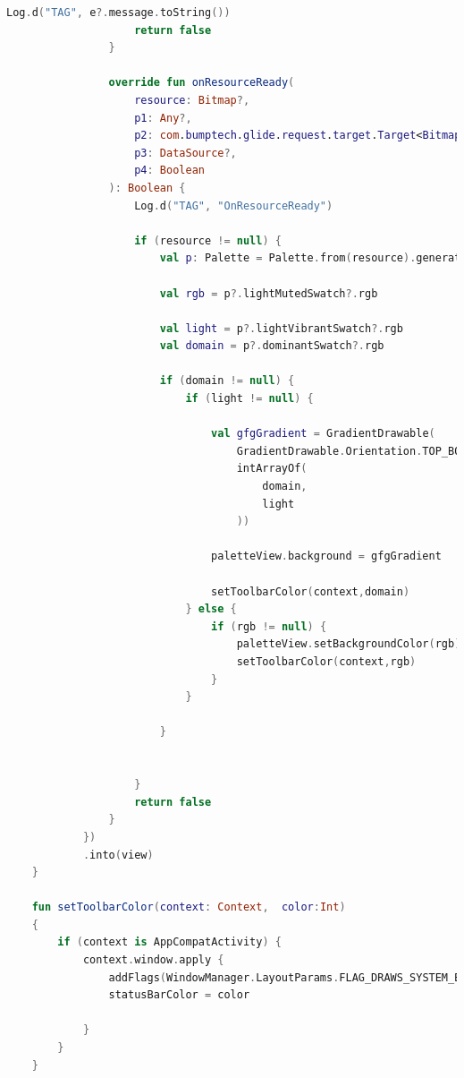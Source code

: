 \documentclass[a4paper, 12pt]{article}
\begin{document}
\begin{lstlisting}[caption={Add New View Adapters on ViewBindings.}, label={code:view_adapters}, language=Kotlin]
                    Log.d("TAG", e?.message.toString())
                    return false
                }

                override fun onResourceReady(
                    resource: Bitmap?,
                    p1: Any?,
                    p2: com.bumptech.glide.request.target.Target<Bitmap>?,
                    p3: DataSource?,
                    p4: Boolean
                ): Boolean {
                    Log.d("TAG", "OnResourceReady")

                    if (resource != null) {
                        val p: Palette = Palette.from(resource).generate()

                        val rgb = p?.lightMutedSwatch?.rgb

                        val light = p?.lightVibrantSwatch?.rgb
                        val domain = p?.dominantSwatch?.rgb

                        if (domain != null) {
                            if (light != null) {

                                val gfgGradient = GradientDrawable(
                                    GradientDrawable.Orientation.TOP_BOTTOM,
                                    intArrayOf(
                                        domain,
                                        light
                                    ))

                                paletteView.background = gfgGradient

                                setToolbarColor(context,domain)
                            } else {
                                if (rgb != null) {
                                    paletteView.setBackgroundColor(rgb)
                                    setToolbarColor(context,rgb)
                                }
                            }

                        }


                    }
                    return false
                }
            })
            .into(view)
    }

    fun setToolbarColor(context: Context,  color:Int)
    {
        if (context is AppCompatActivity) {
            context.window.apply {
                addFlags(WindowManager.LayoutParams.FLAG_DRAWS_SYSTEM_BAR_BACKGROUNDS)
                statusBarColor = color

            }
        }
    }


\end{lstlisting}
\end{document}
